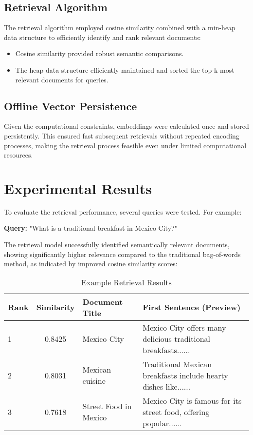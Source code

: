 \documentclass{article}
\begin{document}
\subsection{Retrieval Algorithm}

The retrieval algorithm employed cosine similarity combined with a min-heap data structure to efficiently identify and rank relevant documents:
\begin{itemize}
    \item Cosine similarity provided robust semantic comparisons.
    \item The heap data structure efficiently maintained and sorted the top-k most relevant documents for queries.
\end{itemize}

\subsection{Offline Vector Persistence}

Given the computational constraints, embeddings were calculated once and stored persistently. This ensured fast subsequent retrievals without repeated encoding processes, making the retrieval process feasible even under limited computational resources.

\section{Experimental Results}

To evaluate the retrieval performance, several queries were tested. For example:

\textbf{Query:} "What is a traditional breakfast in Mexico City?"

The retrieval model successfully identified semantically relevant documents, showing significantly higher relevance compared to the traditional bag-of-words method, as indicated by improved cosine similarity scores:

\begin{table}[h!]
    \centering
    \begin{tabular}{lcll}
    \toprule
    Rank & Similarity & Document Title & First Sentence (Preview) \\
    \midrule
    1 & 0.8425 & Mexico City & Mexico City offers many delicious traditional breakfasts...... \\
    2 & 0.8031 & Mexican cuisine & Traditional Mexican breakfasts include hearty dishes like...... \\
    3 & 0.7618 & Street Food in Mexico & Mexico City is famous for its street food, offering popular...... \\
    \bottomrule
    \end{tabular}
    \caption{Example Retrieval Results}
\end{table}
\end{document}
